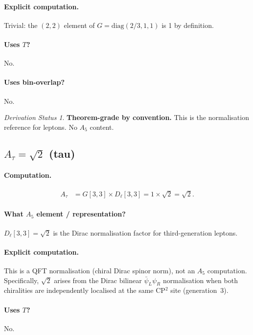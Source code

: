 \documentclass[11pt]{article}
\theoremstyle{remark}
\newtheorem*{status}{Derivation Status}
\begin{document}
\paragraph{Explicit computation.}
Trivial: the $(2,2)$ element of $G = \mathrm{diag}(2/3, 1, 1)$ is 1 by definition.

\paragraph{Uses $T$?} No.
\paragraph{Uses bin-overlap?} No.

\begin{status}
\textbf{Theorem-grade by convention.}
This is the normalisation reference for leptons.  No $A_5$ content.
\end{status}

\subsection{$A_\tau = \sqrt{2}$ \quad (tau)}

\paragraph{Computation.}
\begin{align}
A_\tau &= G[3,3] \times D_\ell[3,3] = 1 \times \sqrt{2} = \sqrt{2}.
\end{align}

\paragraph{What $A_5$ element / representation?}
$D_\ell[3,3] = \sqrt{2}$ is the Dirac normalisation factor for third-generation leptons.

\paragraph{Explicit computation.}
This is a QFT normalisation (chiral Dirac spinor norm), not an $A_5$ computation.
Specifically, $\sqrt{2}$ arises from the Dirac bilinear $\bar\psi_L \psi_R$ normalisation when both chiralities are independently localised at the same CP$^2$ site (generation~3).

\paragraph{Uses $T$?} No.
\end{document}
